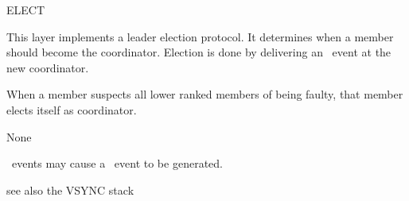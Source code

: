 \begin{Layer}{ELECT}

This layer implements a leader election protocol.  It determines when a member
should become the coordinator.  Election is done by delivering an \DnElect\
event at the new coordinator.

\begin{Protocol}
When a member suspects all lower ranked members of being faulty, that member elects
itself as coordinator.
\end{Protocol}

\begin{Parameters}
\item None
\end{Parameters}

\begin{Properties}
\item
\UpSuspect\ events may cause a \DnElect\ event to be generated.
\end{Properties}

\begin{Sources}
\end{Sources}

\begin{GenEvent}
\genevent{\DnElect}
\end{GenEvent}

\begin{Testing}
\item
see also the VSYNC stack
\end{Testing}
\end{Layer}

